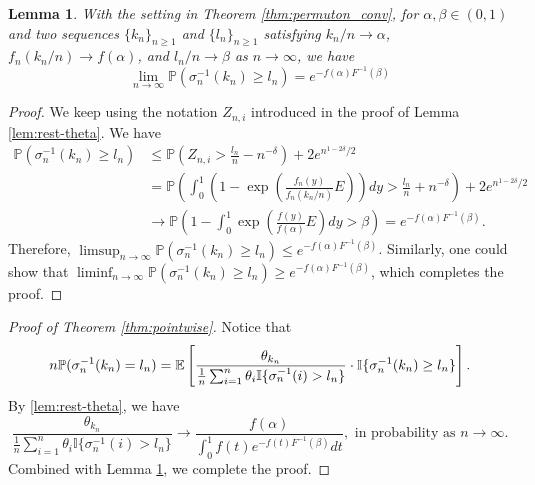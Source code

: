 \documentclass[10pt]{article}
\newtheorem{lem}[thm]{Lemma}
\numberwithin{equation}{section}
\begin{document}
\begin{lem}\label{lem:occurlate}
        With the setting in Theorem \ref{thm:permuton_conv}, for $\alpha,\beta \in (0,1)$ and two sequences $\{k_n\}_{n\geq 1}$ and $\{l_n\}_{n\geq 1}$ satisfying $k_n/n\to \alpha$, $f_n(k_n/n)\to f(\alpha)$, and $l_n/n\to \beta$ as $n\to \infty$, we have
        \begin{equation}
            \lim_{n\to \infty}\mathbb P (\sigma^{-1}_n(k_n)\ge l_n)=e^{-f(\alpha)F^{-1}(\beta)}
        \end{equation}
    \end{lem}
    \begin{proof}
        We keep using the notation $Z_{n,i}$ introduced in the proof of Lemma \ref{lem:rest-theta}.
        We have
        \begin{align}
            \mathbb P(\sigma^{-1}_n(k_n)\ge l_n)
            &\leq \mathbb P(Z_{n,i}> \frac{l_n}{n}-n^{-\delta})+2e^{n^{1-2\delta}/2}\\
            &=\mathbb P(\int_0^1(1-\exp(\frac{f_n(y)}{f_n(k_n/n)}E))dy>\frac{l_n}{n}+n^{-\delta})+2e^{n^{1-2\delta}/2}\\
            &\to \mathbb P(1-\int_0^1\exp (\frac{f(y)}{f(\alpha)}E)dy>\beta)=e^{-f(\alpha)F^{-1}(\beta)}.
        \end{align}
        Therefore, $\limsup_{n\to \infty }\mathbb P(\sigma^{-1}_n(k_n)\ge l_n)\le e^{-f(\alpha)F^{-1}(\beta)}$. Similarly, one could show that $\liminf_{n\to \infty }\mathbb P(\sigma^{-1}_n(k_n)\ge l_n)\ge e^{-f(\alpha)F^{-1}(\beta)}$, which completes the proof.
    \end{proof}

\begin{proof}[Proof of Theorem \ref{thm:pointwise}]
    Notice that 
    \begin{equation}
        n\mathbb P(\sigma^{-1}_n(k_n)=l_n)
        =\mathbb E\left[\frac{\theta_{k_n}}{\frac{1}{n}\sum_{i=1}^n \theta_i \mathbb I\{\sigma^{-1}_n(i)>l_n\}}\cdot \mathbb I\{\sigma^{-1}_n(k_n)\ge l_n\}\right].
    \end{equation}
    By \ref{lem:rest-theta}, we have
    \begin{equation}
        \frac{\theta_{k_n}}{\frac{1}{n}\sum_{i=1}^n \theta_i \mathbb I\{\sigma^{-1}_n(i)>l_n\}} \to \frac{f(\alpha)}{\int_0^1f(t)e^{-f(t)F^{-1}(\beta)}dt}, \mbox{ in probability as } n \to \infty.
    \end{equation}
    Combined with Lemma \ref{lem:occurlate}, we complete the proof.
\end{proof}
\end{document}
